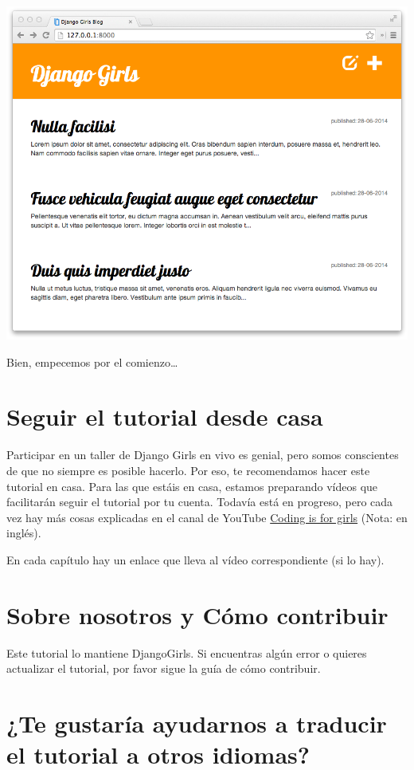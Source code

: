 \documentclass[
  a4paper,
  DIV=11,
  numbers=noendperiod,
  onepage,
  openany]{scrreprt}
\begin{document}
\includegraphics{unidades/unidad1/images/paste-2.png}

Bien, empecemos por el comienzo\ldots{}

\chapter{Seguir el tutorial desde
casa}\label{seguir-el-tutorial-desde-casa}

Participar en un taller de Django Girls en vivo es genial, pero somos
conscientes de que no siempre es posible hacerlo. Por eso, te
recomendamos hacer este tutorial en casa. Para las que estáis en casa,
estamos preparando vídeos que facilitarán seguir el tutorial por tu
cuenta. Todavía está en progreso, pero cada vez hay más cosas explicadas
en el canal de YouTube
\href{https://www.youtube.com/channel/UC0hNd2uW8jTR5K3KBzRuG2A/feed}{Coding
is for girls} (Nota: en inglés).

En cada capítulo hay un enlace que lleva al vídeo correspondiente (si lo
hay).

\chapter{Sobre nosotros y Cómo
contribuir}\label{sobre-nosotros-y-cuxf3mo-contribuir}

Este tutorial lo mantiene DjangoGirls. Si encuentras algún error o
quieres actualizar el tutorial, por favor sigue la guía de cómo
contribuir.

\chapter{¿Te gustaría ayudarnos a traducir el tutorial a otros
idiomas?}\label{te-gustaruxeda-ayudarnos-a-traducir-el-tutorial-a-otros-idiomas}
\end{document}
